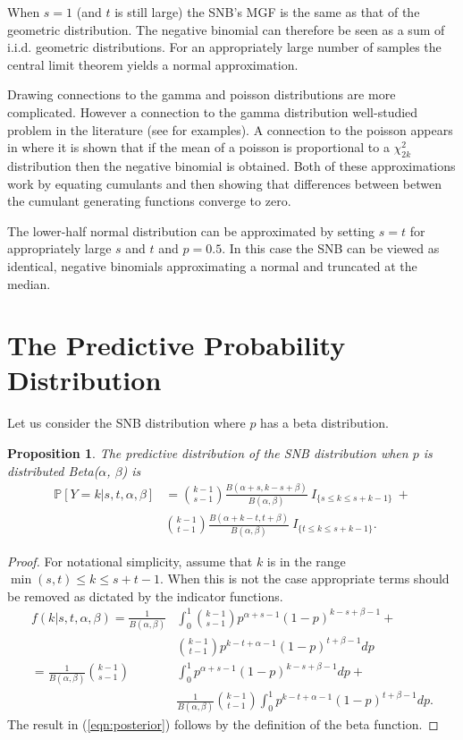 \documentclass[review]{elsarticle}
\newtheorem{prop}{Proposition}
\begin{document}
When $s=1$ (and $t$ is still large) the SNB's MGF is the same as that of the
geometric distribution. The negative
binomial can therefore be seen as a sum of i.i.d. geometric distributions.
For an appropriately large number of samples the central limit theorem
yields a normal approximation.

Drawing connections to the gamma and poisson distributions are more complicated.
However a connection to the gamma distribution well-studied problem in the 
literature (see \cite{Ord1968,Guenther1972,Best1974} for examples). 
A connection to the poisson appears in \cite{Anscombe1950} where
it is shown that if the mean of a poisson is proportional
to a $\chi^2_{2k}$ distribution then the negative binomial is obtained. 
Both of these approximations work by equating cumulants and then showing 
that differences between betwen the cumulant generating
functions converge to zero.

The lower-half normal distribution can be approximated by setting $s=t$
for appropriately large $s$ and $t$ and $p = 0.5$. In this
case the SNB can be viewed as identical, negative binomials
approximating a normal and truncated at the median.

\section{The Predictive Probability Distribution}

Let us consider the SNB distribution where $p$ has a beta distribution.
\begin{prop} \label{prop:bayesian}
The predictive distribution of the SNB
distribution when $p$ is distributed Beta($\alpha$, $\beta$) is
\begin{align} \label{eqn:posterior}
\mathbb{P} [Y = k | s, t, \alpha, \beta ] &= 
  {k-1 \choose s-1} \frac{B\left(\alpha+s, k-s+\beta \right)}{B(\alpha, \beta)} 
    \ I_{\{s \leq k \leq s+k-1\}} \ + \nonumber \\
  & {k-1 \choose t-1} 
    \frac{B\left(\alpha + k - t, t+\beta\right)}{B(\alpha, \beta)} 
    \ I_{\{t \leq k \leq s+k-1\}}.
\end{align}
\end{prop}
\begin{proof}
For notational simplicity, assume that $k$ is in the range
$\min(s,t) \leq k \leq s+t-1$. When 
this is not the case appropriate terms should be removed as dictated by the indicator functions.
\begin{align*}
f(k | s, t, \alpha, \beta) = \frac{1}{B(\alpha, \beta)} & \int_0^1 {k-1 \choose s-1} p^{\alpha +s -1} \left(1-p\right)^{k-s+\beta-1} + \\
 & {k-1 \choose t-1} p^{k-t+\alpha-1}\left(1-p\right)^{t+\beta-1} dp \\
= \frac{1}{B(\alpha, \beta)}  {k-1 \choose s-1} & \int_0^1  p^{\alpha +s -1} \left(1-p\right)^{k-s+\beta-1} dp + \\
 & \frac{1}{B(\alpha, \beta)} {k-1 \choose t-1} \int_0^1  p^{k-t+\alpha-1}\left(1-p\right)^{t+\beta-1} dp.
\end{align*}
The result in (\ref{eqn:posterior}) follows by the definition of the 
beta function.
\end{proof}
\end{document}
